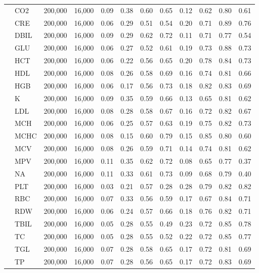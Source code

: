 \begin{table}[ht]
\begin{tabular}{llrrrrrrrrrr}
 & CO2 & 200,000 & 16,000 & 0.09 & 0.38 & 0.60 & 0.65 & 0.12 & 0.62 & 0.80 & 0.61 \\
 & CRE & 200,000 & 16,000 & 0.06 & 0.29 & 0.51 & 0.54 & 0.20 & 0.71 & 0.89 & 0.76 \\
 & DBIL & 200,000 & 16,000 & 0.09 & 0.29 & 0.62 & 0.72 & 0.11 & 0.71 & 0.77 & 0.54 \\
 & GLU & 200,000 & 16,000 & 0.06 & 0.27 & 0.52 & 0.61 & 0.19 & 0.73 & 0.88 & 0.73 \\
 & HCT & 200,000 & 16,000 & 0.06 & 0.22 & 0.56 & 0.65 & 0.20 & 0.78 & 0.84 & 0.73 \\
 & HDL & 200,000 & 16,000 & 0.08 & 0.26 & 0.58 & 0.69 & 0.16 & 0.74 & 0.81 & 0.66 \\
 & HGB & 200,000 & 16,000 & 0.06 & 0.17 & 0.56 & 0.73 & 0.18 & 0.82 & 0.83 & 0.69 \\
 & K & 200,000 & 16,000 & 0.09 & 0.35 & 0.59 & 0.66 & 0.13 & 0.65 & 0.81 & 0.62 \\
 & LDL & 200,000 & 16,000 & 0.08 & 0.28 & 0.58 & 0.67 & 0.16 & 0.72 & 0.82 & 0.67 \\
 & MCH & 200,000 & 16,000 & 0.06 & 0.25 & 0.57 & 0.63 & 0.19 & 0.75 & 0.82 & 0.73 \\
 & MCHC & 200,000 & 16,000 & 0.08 & 0.15 & 0.60 & 0.79 & 0.15 & 0.85 & 0.80 & 0.60 \\
 & MCV & 200,000 & 16,000 & 0.08 & 0.26 & 0.59 & 0.71 & 0.14 & 0.74 & 0.81 & 0.62 \\
 & MPV & 200,000 & 16,000 & 0.11 & 0.35 & 0.62 & 0.72 & 0.08 & 0.65 & 0.77 & 0.37 \\
 & NA & 200,000 & 16,000 & 0.11 & 0.33 & 0.61 & 0.73 & 0.09 & 0.68 & 0.79 & 0.40 \\
 & PLT & 200,000 & 16,000 & 0.03 & 0.21 & 0.57 & 0.28 & 0.28 & 0.79 & 0.82 & 0.82 \\
 & RBC & 200,000 & 16,000 & 0.07 & 0.33 & 0.56 & 0.59 & 0.17 & 0.67 & 0.84 & 0.71 \\
 & RDW & 200,000 & 16,000 & 0.06 & 0.24 & 0.57 & 0.66 & 0.18 & 0.76 & 0.82 & 0.71 \\
 & TBIL & 200,000 & 16,000 & 0.05 & 0.28 & 0.55 & 0.49 & 0.23 & 0.72 & 0.85 & 0.78 \\
 & TC & 200,000 & 16,000 & 0.05 & 0.28 & 0.55 & 0.52 & 0.22 & 0.72 & 0.85 & 0.77 \\
 & TGL & 200,000 & 16,000 & 0.07 & 0.28 & 0.58 & 0.65 & 0.17 & 0.72 & 0.81 & 0.69 \\
 & TP & 200,000 & 16,000 & 0.07 & 0.28 & 0.56 & 0.65 & 0.17 & 0.72 & 0.83 & 0.69 \\

\end{tabular}
\end{table}
